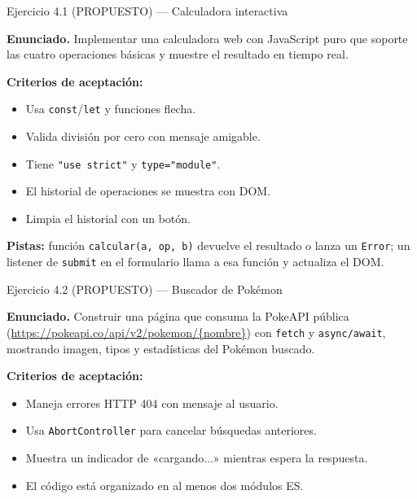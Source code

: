 \documentclass[11pt,a4paper,openany]{book}
\begin{document}
	\begin{cajaejercicio}{Ejercicio 4.1 (PROPUESTO) --- Calculadora interactiva}
		
		\textbf{Enunciado.} Implementar una calculadora web con JavaScript
		puro que soporte las cuatro operaciones básicas y muestre el
		resultado en tiempo real.
		
		\textbf{Criterios de aceptación:}
		\begin{itemize}
			\item Usa \texttt{const}/\texttt{let} y funciones flecha.
			\item Valida división por cero con mensaje amigable.
			\item Tiene \texttt{"use strict"} y \texttt{type="module"}.
			\item El historial de operaciones se muestra con DOM.
			\item Limpia el historial con un botón.
		\end{itemize}
		
		\textbf{Pistas:} función \texttt{calcular(a, op, b)} devuelve
		el resultado o lanza un \texttt{Error}; un listener de
		\texttt{submit} en el formulario llama a esa función y actualiza
		el DOM.
	\end{cajaejercicio}
	
	\begin{cajaejercicio}{Ejercicio 4.2 (PROPUESTO) --- Buscador de Pokémon}
		
		\textbf{Enunciado.} Construir una página que consuma la PokeAPI
		pública (\url{https://pokeapi.co/api/v2/pokemon/\{nombre\}}) con
		\texttt{fetch} y \texttt{async/await}, mostrando imagen, tipos y
		estadísticas del Pokémon buscado.
		
		\textbf{Criterios de aceptación:}
		\begin{itemize}
			\item Maneja errores HTTP 404 con mensaje al usuario.
			\item Usa \texttt{AbortController} para cancelar búsquedas anteriores.
			\item Muestra un indicador de «cargando...» mientras espera la respuesta.
			\item El código está organizado en al menos dos módulos ES.
		\end{itemize}
	\end{cajaejercicio}
	
\end{document}
